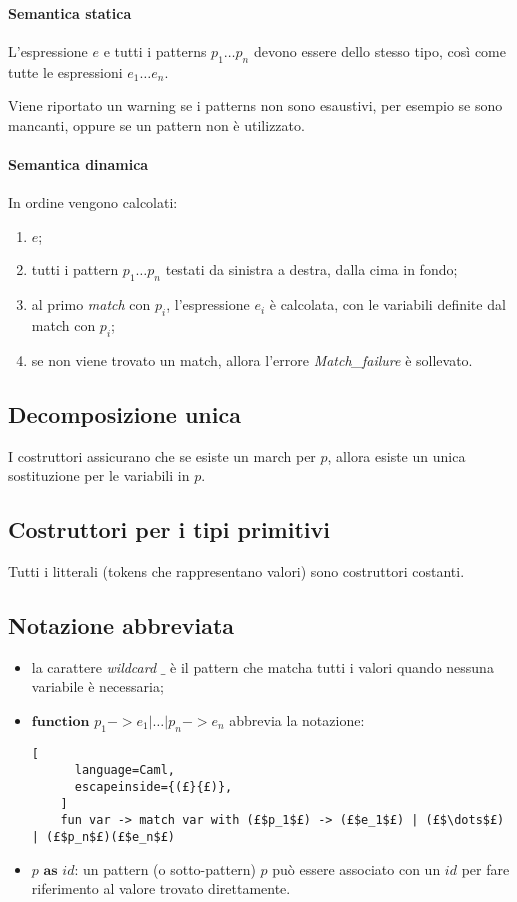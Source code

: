 \paragraph{Semantica statica}
L'espressione $e$ e tutti i patterns $p_1\dots p_n$ devono essere dello stesso
tipo, così come tutte le espressioni $e_1\dots e_n$.


Viene riportato un warning se i patterns non sono esaustivi, per esempio
se sono mancanti, oppure se un pattern non è utilizzato.

\paragraph{Semantica dinamica}
In ordine vengono calcolati:
\begin{enumerate}
  \item $e$;
  \item tutti i pattern $p_1\dots p_n$ testati da sinistra a destra, dalla cima
    in fondo;
  \item al primo \emph{match} con $p_i$, l'espressione $e_i$ è calcolata,
    con le variabili definite dal match con $p_i$;
  \item se non viene trovato un match, allora l'errore \emph{Match\_failure}
    è sollevato.
\end{enumerate}

\subsection{Decomposizione unica}
I costruttori assicurano che se esiste un march per $p$, allora esiste un unica sostituzione per le variabili in $p$.

\subsection{Costruttori per i tipi primitivi}
Tutti i litterali (tokens che rappresentano valori) sono costruttori costanti.

\subsection{Notazione abbreviata}
\begin{itemize}
  \item la carattere \textit{wildcard} $\_$ è il pattern che matcha tutti i
    valori quando nessuna variabile è necessaria;
  \item $\textbf{function } p_1->e_1|\dots|p_n->e_n$ abbrevia la notazione:
    \begin{lstlisting}[
      language=Caml,
      escapeinside={(£}{£)},
    ]
    fun var -> match var with (£$p_1$£) -> (£$e_1$£) | (£$\dots$£) | (£$p_n$£)(£$e_n$£)
    \end{lstlisting}
  \item $p \textbf{ as } id$: un pattern (o sotto-pattern) $p$ può essere
    associato con un $id$ per fare riferimento al valore trovato direttamente.
\end{itemize}

